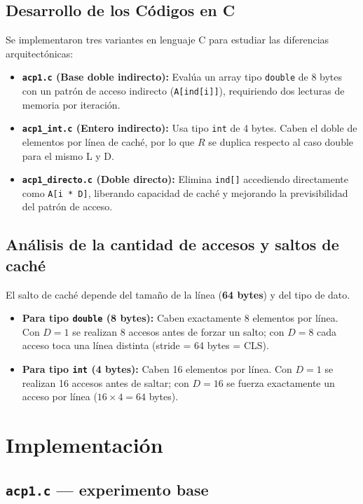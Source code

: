 \documentclass[12pt,a4paper]{article}
\begin{document}
\subsection{Desarrollo de los Códigos en C}
Se implementaron tres variantes en lenguaje C para estudiar las diferencias arquitectónicas:
\begin{itemize}[leftmargin=1.5em]
  \item \textbf{\texttt{acp1.c} (Base doble indirecto):} Evalúa un array tipo \texttt{double} de 8 bytes con un patrón de acceso indirecto (\texttt{A[ind[i]]}), requiriendo dos lecturas de memoria por iteración.
  \item \textbf{\texttt{acp1\_int.c} (Entero indirecto):} Usa tipo \texttt{int} de 4 bytes. Caben el doble de elementos por línea de caché, por lo que $R$ se duplica respecto al caso double para el mismo L y D.
  \item \textbf{\texttt{acp1\_directo.c} (Doble directo):} Elimina \texttt{ind[]} accediendo directamente como \texttt{A[i * D]}, liberando capacidad de caché y mejorando la previsibilidad del patrón de acceso.
\end{itemize}

\subsection{Análisis de la cantidad de accesos y saltos de caché}
El salto de caché depende del tamaño de la línea (\textbf{64 bytes}) y del tipo de dato.
\begin{itemize}[leftmargin=1.5em]
  \item \textbf{Para tipo \texttt{double} (8 bytes):} Caben exactamente 8 elementos por línea. Con $D=1$ se realizan 8 accesos antes de forzar un salto; con $D=8$ cada acceso toca una línea distinta (stride = 64 bytes = CLS).
  \item \textbf{Para tipo \texttt{int} (4 bytes):} Caben 16 elementos por línea. Con $D=1$ se realizan 16 accesos antes de saltar; con $D=16$ se fuerza exactamente un acceso por línea ($16 \times 4 = 64$ bytes).
\end{itemize}

\section{Implementación}

\subsection{\texttt{acp1.c} --- experimento base}
\end{document}
